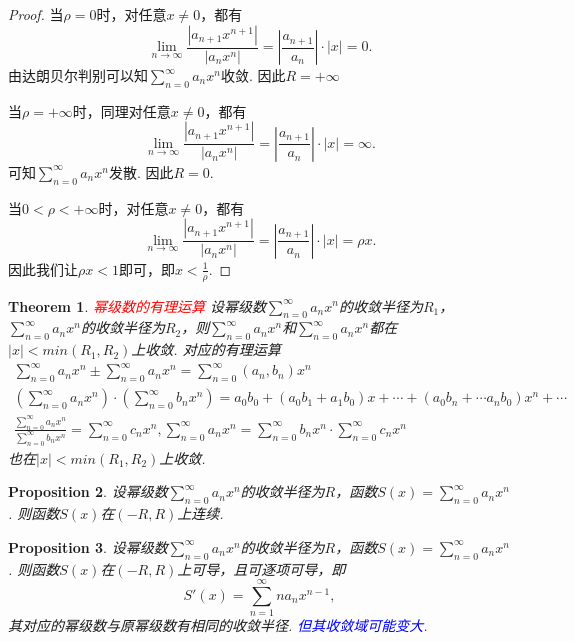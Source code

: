 \documentclass{article}
\newtheorem{theorem}{Theorem}[section]
\newtheorem{proposition}[theorem]{Proposition}
\newcommand{\redt}[1]{\textcolor{red}{#1}}
\newcommand{\bluet}[1]{\textcolor{blue}{#1}}
\begin{document}
\begin{proof}
\rm 当$\rho=0$时，对任意$x \neq 0$，都有
$$
\lim\limits_{n \to \infty}\frac{|a_{n+1}x^{n+1}|}{|a_{n}x^n|} = \left|\frac{a_{n+1}}{a_n}\right|\cdot |x| = 0.
$$
由达朗贝尔判别可以知$\sum\limits_{n=0}^{\infty}a_nx^n$收敛. 因此$R = +\infty$ 

当$\rho = +\infty$时，同理对任意$x \neq 0$，都有
$$
\lim\limits_{n \to \infty}\frac{|a_{n+1}x^{n+1}|}{|a_{n}x^n|} = \left|\frac{a_{n+1}}{a_n}\right|\cdot |x| = \infty.
$$
可知$\sum\limits_{n=0}^{\infty}a_nx^n$发散. 因此$R = 0$.

当$0 < \rho < +\infty$时，对任意$x \neq 0$，都有
$$
\lim\limits_{n \to \infty}\frac{|a_{n+1}x^{n+1}|}{|a_{n}x^n|} = \left|\frac{a_{n+1}}{a_n}\right|\cdot|x|  = \rho x.
$$
因此我们让$\rho x < 1$即可，即$x < \frac{1}{\rho}$. 
\end{proof}

\begin{theorem}
\rm \redt{幂级数的有理运算} 设幂级数$\sum\limits_{n=0}^{\infty}a_nx^n$的收敛半径为$R_1$，$\sum\limits_{n=0}^{\infty}a_nx^n$的收敛半径为$R_2$，则$\sum\limits_{n=0}^{\infty}a_nx^n$和$\sum\limits_{n=0}^{\infty}a_nx^n$都在$|x| < min(R_1,R_2)$上收敛. 对应的有理运算
$$
\begin{array}{ll}
\sum\limits_{n=0}^{\infty}a_nx^n \pm \sum\limits_{n=0}^{\infty}a_nx^n = \sum\limits_{n=0}^{\infty}(a_n,b_n)x^n \\ 
\left(\sum\limits_{n=0}^{\infty}a_nx^n \right) \cdot \left( \sum\limits_{n=0}^{\infty}b_nx^n \right) = a_0b_0  + (a_0b_1+a_1b_0)x + \cdots + (a_0b_n + \cdots a_nb_0)x^n +\cdots \\
\frac{\sum\limits_{n=0}^{\infty}a_nx^n}{\sum\limits_{n=0}^{\infty}b_nx^n} = \sum\limits_{n=0}^{\infty}c_nx^n, \sum\limits_{n=0}^{\infty}a_nx^n  =  \sum\limits_{n=0}^{\infty}b_nx^n \cdot \sum\limits_{n=0}^{\infty}c_nx^n
\end{array}
$$
也在$|x| < min(R_1,R_2)$上收敛. 
\end{theorem}

\begin{proposition}
\rm 设幂级数$\sum\limits_{n=0}^{\infty}a_nx^n$的收敛半径为$R$，函数$S(x) = \sum\limits_{n=0}^{\infty}a_nx^n$. 则函数$S(x)$在$(-R,R)$上连续.
\end{proposition}

\begin{proposition}
\rm 设幂级数$\sum\limits_{n=0}^{\infty}a_nx^n$的收敛半径为$R$，函数$S(x) = \sum\limits_{n=0}^{\infty}a_nx^n$. 则函数$S(x)$在$(-R,R)$上可导，且可逐项可导，即
$$
S'(x) = \sum\limits_{n=1}^{\infty}na_nx^{n-1},
$$
其对应的幂级数与原幂级数有相同的收敛半径. \bluet{但其收敛域可能变大}.
\end{proposition}
\end{document}
